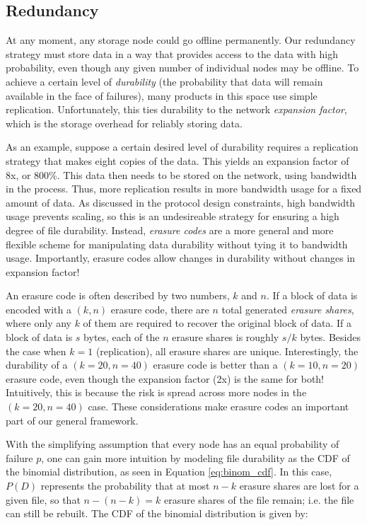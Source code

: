\documentclass[a4paper,10pt]{article} \usepackage[utf8]{inputenc}
\begin{document}
\subsection{Redundancy}

At any moment, any storage node could go offline permanently. Our redundancy
strategy must store data in a way that provides access to the data with high
probability, even though any given number of individual nodes may be offline. To
achieve a certain level of {\em durability} (the probability that data will
remain available in the face of failures), many products in this space use
simple replication. Unfortunately, this ties durability to the network {\em
expansion factor}, which is the storage overhead for reliably storing data.

As an example, suppose a certain desired level of durability requires a
replication strategy that makes eight copies of the data. This yields an
expansion factor of 8x, or 800\%. This data then needs to be stored on the
network, using bandwidth in the process. Thus, more replication results in more
bandwidth usage for a fixed amount of data. As discussed in the protocol design
constraints, high bandwidth usage prevents scaling, so this is an undesireable
strategy for ensuring a high degree of file durability. Instead, {\em erasure
codes} are a more general and more flexible scheme for manipulating data
durability without tying it to bandwidth usage. Importantly, erasure codes allow
changes in durability without changes in expansion factor!

An erasure code is often described by two numbers, $k$ and $n$. If a block of
data is encoded with a $(k,n)$ erasure code, there are $n$ total generated {\em
erasure shares}, where only any $k$ of them are required to recover the original
block of data. If a block of data is $s$ bytes, each of the $n$ erasure shares
is roughly $s/k$ bytes. Besides the case when $k=1$ (replication), all erasure
shares are unique. Interestingly, the durability of a $(k=20,n=40)$ erasure code
is better than a $(k=10,n=20)$ erasure code, even though the expansion factor
(2x) is the same for both! Intuitively, this is because the risk is spread
across more nodes in the $(k=20,n=40)$ case. These considerations make erasure
codes an important part of our general framework.

With the simplifying assumption that every node has an equal probability of
failure $p$, one can gain more intuition by modeling file durability as the CDF
of the binomial distribution, as seen in Equation \eqref{eq:binom_cdf}. In this
case, $P(D)$ represents the probability that at most $n-k$ erasure shares are
lost for a given file, so that $n-(n-k)=k$ erasure shares of the file remain;
i.e. the file can still be rebuilt. The CDF of the binomial distribution is
given by:
\end{document}
